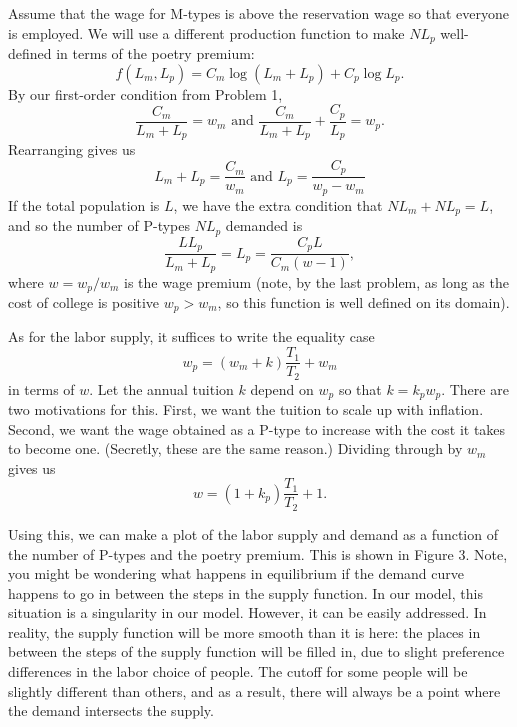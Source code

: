\documentclass[12pt]{article}
\begin{document}
\begin{enumerate}
Assume that the wage for M-types is above the reservation wage so that everyone is employed. We will use a different production function to make $NL_p$ well-defined in terms of the poetry premium:
\[
    f(L_m, L_p) = C_m\log(L_m + L_p) + C_p\log{L_p}.
\]
By our first-order condition from Problem 1,
\[
    \frac{C_m}{L_m + L_p} = w_m \text{ and } \frac{C_m}{L_m + L_p} + \frac{C_p}{L_p} = w_p.
\]
Rearranging gives us
\[
    L_m + L_p = \frac{C_m}{w_m} \text{ and } L_p = \frac{C_p}{w_p - w_m}
\]
If the total population is $L$, we have the extra condition that $NL_m + NL_p = L$, and so the number of P-types $NL_p$ demanded is
\[
    \frac{LL_p}{L_m + L_p} = L_p = \frac{C_pL}{C_m(w - 1)},
\]
where $w = w_p/w_m$ is the wage premium (note, by the last problem, as long as the cost of college is positive $w_p > w_m$, so this function is well defined on its domain).

As for the labor supply, it suffices to write the equality case
\[
    w_p = (w_m + k)\frac{T_1}{T_2} + w_m
\]
in terms of $w$. Let the annual tuition $k$ depend on $w_p$ so that $k = k_pw_p$. There are two motivations for this. First, we want the tuition to scale up with inflation. Second, we want the wage obtained as a P-type to increase with the cost it takes to become one. (Secretly, these are the same reason.) Dividing through by $w_m$ gives us
\[
    w = (1 + k_p)\frac{T_1}{T_2} + 1.
\]

Using this, we can make a plot of the labor supply and demand as a function of the number of P-types and the poetry premium.  This is shown in Figure 3.  Note, you might be wondering what happens in equilibrium if the demand curve happens to go in between the steps in the supply function.  In our model, this situation is a singularity in our model.  However, it can be easily addressed.  In reality, the supply function will be more smooth than it is here: the places in between the steps of the supply function will be filled in, due to slight preference differences in the labor choice of people.  The cutoff for some people will be slightly different than others, and as a result, there will always be a point where the demand intersects the supply.


\end{enumerate}
\end{document}
